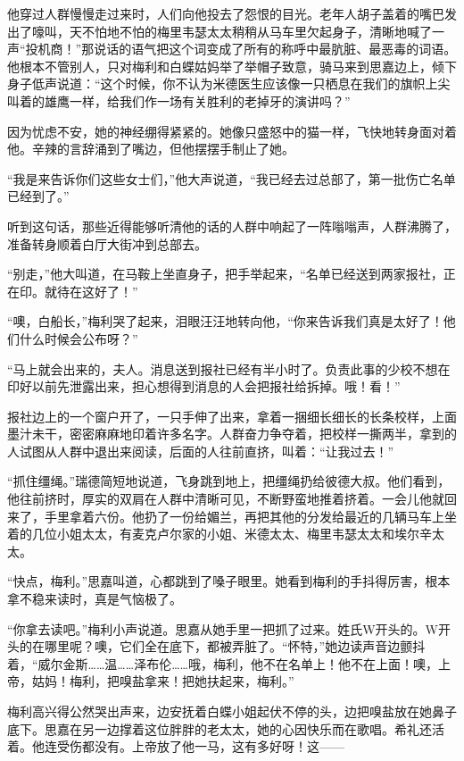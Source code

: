 \par 他穿过人群慢慢走过来时，人们向他投去了怨恨的目光。老年人胡子盖着的嘴巴发出了嚎叫，天不怕地不怕的梅里韦瑟太太稍稍从马车里欠起身子，清晰地喊了一声“投机商！”那说话的语气把这个词变成了所有的称呼中最肮脏、最恶毒的词语。他根本不管别人，只对梅利和白蝶姑妈举了举帽子致意，骑马来到思嘉边上，倾下身子低声说道：“这个时候，你不认为米德医生应该像一只栖息在我们的旗帜上尖叫着的雄鹰一样，给我们作一场有关胜利的老掉牙的演讲吗？”
\par 因为忧虑不安，她的神经绷得紧紧的。她像只盛怒中的猫一样，飞快地转身面对着他。辛辣的言辞涌到了嘴边，但他摆摆手制止了她。
\par “我是来告诉你们这些女士们，”他大声说道，“我已经去过总部了，第一批伤亡名单已经到了。”
\par 听到这句话，那些近得能够听清他的话的人群中响起了一阵嗡嗡声，人群沸腾了，准备转身顺着白厅大街冲到总部去。
\par “别走，”他大叫道，在马鞍上坐直身子，把手举起来，“名单已经送到两家报社，正在印。就待在这好了！”
\par “噢，白船长，”梅利哭了起来，泪眼汪汪地转向他，“你来告诉我们真是太好了！他们什么时候会公布呀？”
\par “马上就会出来的，夫人。消息送到报社已经有半小时了。负责此事的少校不想在印好以前先泄露出来，担心想得到消息的人会把报社给拆掉。哦！看！”
\par 报社边上的一个窗户开了，一只手伸了出来，拿着一捆细长细长的长条校样，上面墨汁未干，密密麻麻地印着许多名字。人群奋力争夺着，把校样一撕两半，拿到的人试图从人群中退出来阅读，后面的人往前直挤，叫着：“让我过去！”
\par “抓住缰绳。”瑞德简短地说道，飞身跳到地上，把缰绳扔给彼德大叔。他们看到，他往前挤时，厚实的双肩在人群中清晰可见，不断野蛮地推着挤着。一会儿他就回来了，手里拿着六份。他扔了一份给媚兰，再把其他的分发给最近的几辆马车上坐着的几位小姐太太，有麦克卢尔家的小姐、米德太太、梅里韦瑟太太和埃尔辛太太。
\par “快点，梅利。”思嘉叫道，心都跳到了嗓子眼里。她看到梅利的手抖得厉害，根本拿不稳来读时，真是气恼极了。
\par “你拿去读吧。”梅利小声说道。思嘉从她手里一把抓了过来。姓氏W开头的。W开头的在哪里呢？噢，它们全在底下，都被弄脏了。“怀特，”她边读声音边颤抖着，“威尔金斯……温……泽布伦……哦，梅利，他不在名单上！他不在上面！噢，上帝，姑妈！梅利，把嗅盐拿来！把她扶起来，梅利。”
\par 梅利高兴得公然哭出声来，边安抚着白蝶小姐起伏不停的头，边把嗅盐放在她鼻子底下。思嘉在另一边撑着这位胖胖的老太太，她的心因快乐而在歌唱。希礼还活着。他连受伤都没有。上帝放了他一马，这有多好呀！这——

